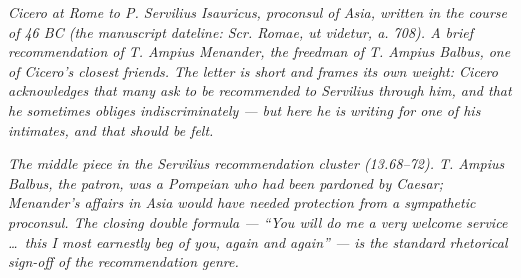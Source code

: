 
\textit{Cicero at Rome to P. Servilius Isauricus, proconsul of
Asia, written in the course of 46 BC (the manuscript dateline:
\textit{Scr. Romae, ut videtur, a. 708}). A brief recommendation
of T. Ampius Menander, the freedman of T. Ampius Balbus, one of
Cicero's closest friends. The letter is short and frames its own
weight: Cicero acknowledges that many ask to be recommended to
Servilius through him, and that he sometimes obliges
indiscriminately --- but here he is writing for one of his
intimates, and that should be felt.}

\textit{The middle piece in the Servilius recommendation cluster
(13.68--72). T. Ampius Balbus, the patron, was a Pompeian who had
been pardoned by Caesar; Menander's affairs in Asia would have
needed protection from a sympathetic proconsul. The closing
double formula --- ``You will do me a very welcome service \ldots\
this I most earnestly beg of you, again and again'' --- is the
standard rhetorical sign-off of the recommendation genre.}
